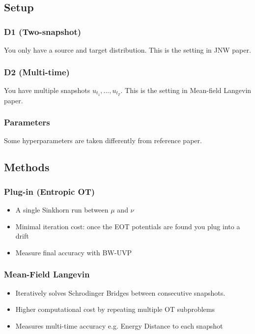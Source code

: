 \documentclass{article}
\begin{document}
\subsection{Setup}
\subsubsection{D1 (Two-snapshot)}
You only have a source and target distribution. This is the setting in JNW paper.
\subsubsection{D2 (Multi-time)}
You have multiple snapshots $u_{t_1},...,u_{t_T}$. This is the setting in   Mean-field Langevin paper.
\subsubsection{Parameters}
Some hyperparameters are taken differently from reference paper.

\subsection{Methods}
\subsubsection{Plug-in (Entropic OT)}
\begin{itemize}
    \item A single Sinkhorn run between $\mu$ and $\nu$
    \item Minimal iteration cost: once the EOT potentials are found you plug into a drift
    \item Measure final accuracy with BW-UVP
\end{itemize}
\subsubsection{Mean-Field Langevin}
\begin{itemize}
    \item Iteratively solves Schrodinger Bridges between consecutive snapshots.
    \item Higher computational cost by repeating multiple OT subproblems
    \item Measures multi-time accuracy e.g. Energy Distance to each snapshot

\end{itemize}
\end{document}
